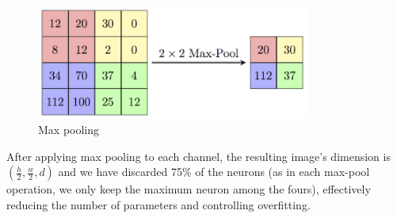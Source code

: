 \begin{figure}
\centering
\includegraphics[width=0.8\textwidth]{Images/maxpool.png}
\caption{Max pooling \cite{camb-spark}}
\end{figure}

After applying max pooling to each channel, the resulting image's dimension is $(\frac{h}{2}, \frac{w}{2}, d)$ and we have discarded 75\% of the neurons (as in each max-pool operation, we only keep the maximum neuron among the fours), effectively reducing the number of parameters and controlling overfitting.




